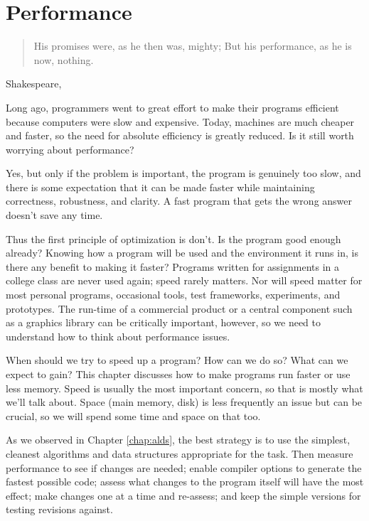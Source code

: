 \chapter{Performance}
\label{chap:performance}
\begin{quote}
    His promises were, as he then was, mighty; But his performance, as he
    is now, nothing.
\end{quote}
\begin{quotesrc}
    Shakespeare, 
\end{quotesrc}

Long ago, programmers went to great effort to make their programs efficient
because computers were slow and expensive. Today, machines are much cheaper
and faster, so the need for absolute efficiency is greatly reduced. Is it
still worth worrying about performance?

Yes, but only if the problem is important, the program is genuinely too
slow, and there is some expectation that it can be made faster while
maintaining correctness, robustness, and clarity. A fast program that gets
the wrong answer doesn't save any time.

Thus the first principle of optimization is don't. Is the program good
enough already? Knowing how a program will be used and the environment it
runs in, is there any benefit to making it faster? Programs written for
assignments in a college class are never used again; speed rarely matters.
Nor will speed matter for most personal programs, occasional tools, test
frameworks, experiments, and prototypes. The run-time of a commercial
product or a central component such as a graphics library can be critically
important, however, so we need to understand how to think about performance
issues.

When should we try to speed up a program? How can we do so? What can we
expect to gain? This chapter discusses how to make programs run faster or
use less memory. Speed is usually the most important concern, so that is
mostly what we'll talk about. Space (main memory, disk) is less frequently
an issue but can be crucial, so we will spend some time and space on that
too.

As we observed in Chapter \ref{chap:alds}, the best strategy is to use the
simplest, cleanest algorithms and data structures appropriate for the task.
Then measure performance to see if changes are needed; enable compiler
options to generate the fastest possible code; assess what changes to the
program itself will have the most effect; make changes one at a time and
re-assess; and keep the simple versions for testing revisions against.

